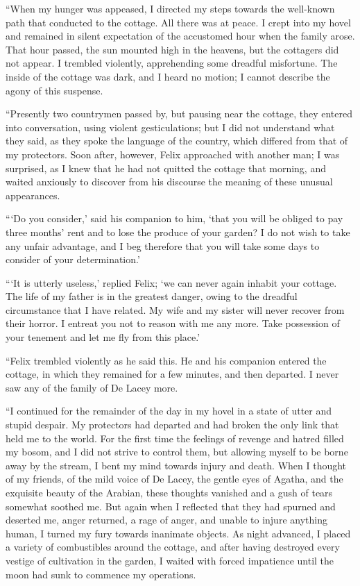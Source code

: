 \documentclass[12pt,openright]{book}
\begin{document}
“When my hunger was appeased, I directed my steps towards the well-known path that conducted to the cottage. All there was at peace. I crept into my hovel and remained in silent expectation of the accustomed hour when the family arose. That hour passed, the sun mounted high in the heavens, but the cottagers did not appear. I trembled violently, apprehending some dreadful misfortune. The inside of the cottage was dark, and I heard no motion; I cannot describe the agony of this suspense.

“Presently two countrymen passed by, but pausing near the cottage, they entered into conversation, using violent gesticulations; but I did not understand what they said, as they spoke the language of the country, which differed from that of my protectors. Soon after, however, Felix approached with another man; I was surprised, as I knew that he had not quitted the cottage that morning, and waited anxiously to discover from his discourse the meaning of these unusual appearances.

“‘Do you consider,’ said his companion to him, ‘that you will be obliged to pay three months’ rent and to lose the produce of your garden? I do not wish to take any unfair advantage, and I beg therefore that you will take some days to consider of your determination.’

“‘It is utterly useless,’ replied Felix; ‘we can never again inhabit your cottage. The life of my father is in the greatest danger, owing to the dreadful circumstance that I have related. My wife and my sister will never recover from their horror. I entreat you not to reason with me any more. Take possession of your tenement and let me fly from this place.’

“Felix trembled violently as he said this. He and his companion entered the cottage, in which they remained for a few minutes, and then departed. I never saw any of the family of De Lacey more.

“I continued for the remainder of the day in my hovel in a state of utter and stupid despair. My protectors had departed and had broken the only link that held me to the world. For the first time the feelings of revenge and hatred filled my bosom, and I did not strive to control them, but allowing myself to be borne away by the stream, I bent my mind towards injury and death. When I thought of my friends, of the mild voice of De Lacey, the gentle eyes of Agatha, and the exquisite beauty of the Arabian, these thoughts vanished and a gush of tears somewhat soothed me. But again when I reflected that they had spurned and deserted me, anger returned, a rage of anger, and unable to injure anything human, I turned my fury towards inanimate objects. As night advanced, I placed a variety of combustibles around the cottage, and after having destroyed every vestige of cultivation in the garden, I waited with forced impatience until the moon had sunk to commence my operations.
\end{document}
